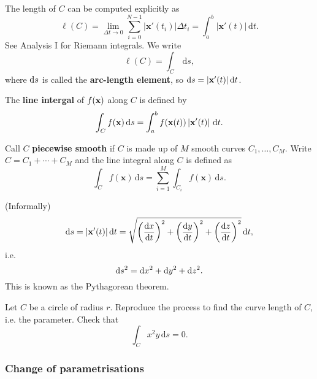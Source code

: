 \begin{definition}
    The length of $C$ can be computed explicitly as 
    \[
        \ell (C) = \lim_{\Delta t \to 0} \sum_{i=0}^{N-1} \left| \mathbf{x}'(t_i) \right| \Delta t_i = \int_{a}^{b} \left| \mathbf{x}'(t) \right|  \,\mathrm{d}t.
    \]
    See Analysis I for Riemann integrals. We write 
    \[
        \ell (C) = \int_{C} \,\mathrm{d}s,
    \]
    where $ \mathrm{d} s $ is called the \textbf{arc-length element}, so $ \mathrm{d} s = |\mathbf{x}'(t)| \,\mathrm{d} t $.
\end{definition}
\begin{definition}
    The \textbf{line intergal} of $f({\bf x})$ along $C$ is defined by 
    \[
        \int_{C} f(\mathbf{x}) \,\mathrm{d}s = \int_{a}^{b} f(\mathbf{x}(t)) \left| {\bf x}'(t) \right| \,\mathrm{d}t.
    \]
\end{definition}
\begin{definition}
    Call $C$ \textbf{piecewise smooth} if $C$ is made up of $M$ smooth curves $ C_1,\dots,C_M $. Write $C=C_1+\cdots+C_M$ and the line integral along $C$ is defined as 
    \[
        \int_{C} f(\mathbf{x}) \,\mathrm{d}s = \sum_{i=1}^{M}\int_{C_i} f(\mathbf{x}) \,\mathrm{d}s.
    \]
\end{definition}
\begin{note}
    (Informally) 
    \[
        \mathrm{d} s = |\mathbf{x}'(t)|\,\mathrm{d} t = \sqrt{\left( \frac{\mathrm{d}x}{\mathrm{d}t}  \right)^2+\left(\frac{\mathrm{d}y}{\mathrm{d}t}  \right)^2+\left(\frac{\mathrm{d}z}{\mathrm{d}t}  \right)^2}\,\mathrm{d} t,
    \]
    i.e.
    \[
        \mathrm{d} s^2 = \mathrm{d} x^2+\mathrm{d} y^2+\mathrm{d} z^2.
    \]
    This is known as the Pythagorean theorem.
\end{note}
\begin{example}
    Let $C$ be a circle of radius $r$. Reproduce the process to find the curve length of $C$, i.e. the parameter. Check that 
    \[
        \int_{C} x^2y \,\mathrm{d}s = 0.
    \]
\end{example}

\subsubsection{Change of parametrisations}

